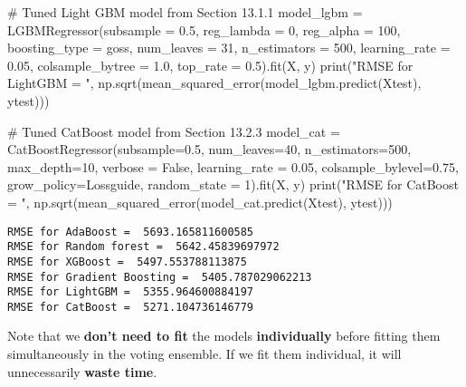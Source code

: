 \documentclass[
  letterpaper,
  DIV=11,
  numbers=noendperiod]{scrreprt}
\newenvironment{Shaded}{\begin{snugshade}}{\end{snugshade}}
\newcommand{\BuiltInTok}[1]{\textcolor[rgb]{0.00,0.23,0.31}{#1}}
\newcommand{\CommentTok}[1]{\textcolor[rgb]{0.37,0.37,0.37}{#1}}
\newcommand{\DecValTok}[1]{\textcolor[rgb]{0.68,0.00,0.00}{#1}}
\newcommand{\FloatTok}[1]{\textcolor[rgb]{0.68,0.00,0.00}{#1}}
\newcommand{\NormalTok}[1]{\textcolor[rgb]{0.00,0.23,0.31}{#1}}
\newcommand{\OperatorTok}[1]{\textcolor[rgb]{0.37,0.37,0.37}{#1}}
\newcommand{\StringTok}[1]{\textcolor[rgb]{0.13,0.47,0.30}{#1}}
\newcommand{\VariableTok}[1]{\textcolor[rgb]{0.07,0.07,0.07}{#1}}
\begin{document}
\begin{Shaded}
\begin{Highlighting}[]
\CommentTok{\# Tuned Light GBM model from Section 13.1.1}
\NormalTok{model\_lgbm }\OperatorTok{=}\NormalTok{ LGBMRegressor(subsample }\OperatorTok{=} \FloatTok{0.5}\NormalTok{, reg\_lambda }\OperatorTok{=} \DecValTok{0}\NormalTok{, reg\_alpha }\OperatorTok{=} \DecValTok{100}\NormalTok{, boosting\_type }\OperatorTok{=} \StringTok{\textquotesingle{}goss\textquotesingle{}}\NormalTok{,}
\NormalTok{            num\_leaves }\OperatorTok{=} \DecValTok{31}\NormalTok{, n\_estimators }\OperatorTok{=} \DecValTok{500}\NormalTok{, learning\_rate }\OperatorTok{=} \FloatTok{0.05}\NormalTok{, colsample\_bytree }\OperatorTok{=} \FloatTok{1.0}\NormalTok{,}
\NormalTok{                          top\_rate }\OperatorTok{=} \FloatTok{0.5}\NormalTok{).fit(X, y)}
\BuiltInTok{print}\NormalTok{(}\StringTok{"RMSE for LightGBM = "}\NormalTok{, np.sqrt(mean\_squared\_error(model\_lgbm.predict(Xtest), ytest)))}

\CommentTok{\# Tuned CatBoost model from Section 13.2.3}
\NormalTok{model\_cat }\OperatorTok{=}\NormalTok{ CatBoostRegressor(subsample}\OperatorTok{=}\FloatTok{0.5}\NormalTok{, num\_leaves}\OperatorTok{=}\DecValTok{40}\NormalTok{, n\_estimators}\OperatorTok{=}\DecValTok{500}\NormalTok{, max\_depth}\OperatorTok{=}\DecValTok{10}\NormalTok{, }
\NormalTok{                              verbose }\OperatorTok{=} \VariableTok{False}\NormalTok{, learning\_rate }\OperatorTok{=} \FloatTok{0.05}\NormalTok{, colsample\_bylevel}\OperatorTok{=}\FloatTok{0.75}\NormalTok{, }
\NormalTok{                              grow\_policy}\OperatorTok{=}\StringTok{\textquotesingle{}Lossguide\textquotesingle{}}\NormalTok{, random\_state }\OperatorTok{=} \DecValTok{1}\NormalTok{).fit(X, y)}
\BuiltInTok{print}\NormalTok{(}\StringTok{"RMSE for CatBoost = "}\NormalTok{, np.sqrt(mean\_squared\_error(model\_cat.predict(Xtest), ytest)))}
\end{Highlighting}
\end{Shaded}

\begin{verbatim}
RMSE for AdaBoost =  5693.165811600585
RMSE for Random forest =  5642.45839697972
RMSE for XGBoost =  5497.553788113875
RMSE for Gradient Boosting =  5405.787029062213
RMSE for LightGBM =  5355.964600884197
RMSE for CatBoost =  5271.104736146779
\end{verbatim}

Note that we \textbf{don't need to fit} the models \textbf{individually}
before fitting them simultaneously in the voting ensemble. If we fit
them individual, it will unnecessarily \textbf{waste time}.
\end{document}

